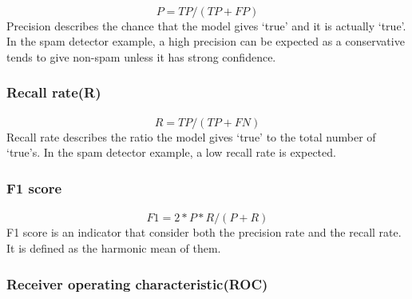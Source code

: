 \paragraph{}
$$P=TP/(TP+FP)$$
Precision describes the chance that the model gives `true' and it is actually `true'.
In the spam detector example, a high precision can be expected as a conservative tends to give non-spam unless it has strong confidence.

\subsubsection{Recall rate(R)}
\paragraph{}
$$R=TP/(TP+FN)$$
Recall rate describes the ratio the model gives `true' to the total number of `true's.
In the spam detector example, a low recall rate is expected.

\subsubsection{F1 score}
\paragraph{}
$$F1 = 2*P*R/(P+R)$$
F1 score is an indicator that consider both the precision rate and the recall rate.
It is defined as the harmonic mean of them.

\subsubsection{Receiver operating characteristic(ROC)}
